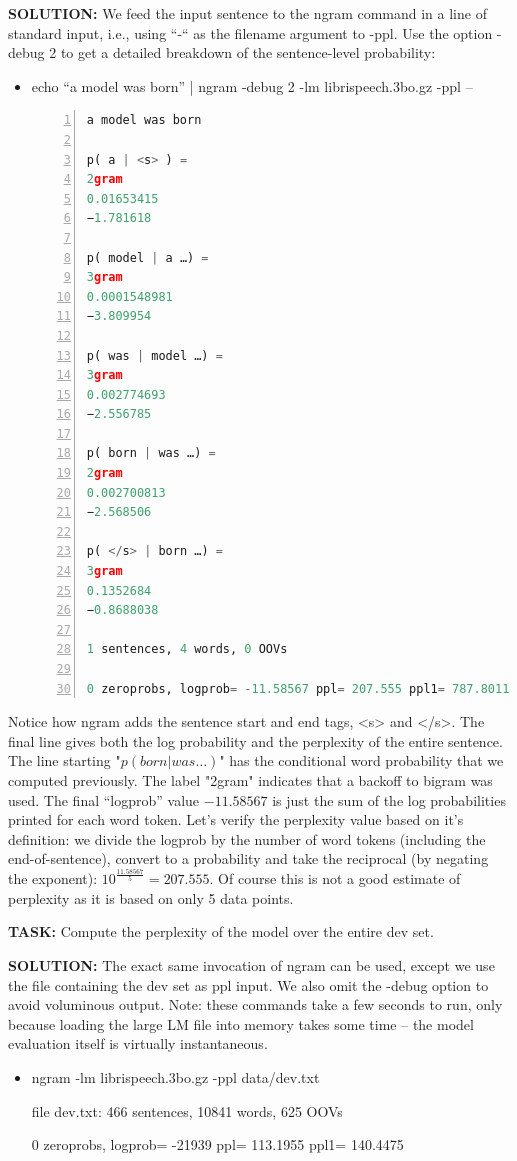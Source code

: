 {\bf SOLUTION:} We feed the input sentence to the ngram command in a line of standard input, i.e., using “-“ as the filename argument to -ppl. Use the option -debug 2 to get a detailed breakdown of the sentence-level probability:
\begin{itemize}
	\item echo “a model was born” | ngram -debug 2 -lm librispeech.3bo.gz -ppl –
\begin{lstlisting}[language = python, numbers=left, 
	 numberstyle=\tiny,keywordstyle=\color{blue!70},
	 commentstyle=\color{red!50!green!50!blue!50},frame=shadowbox,
	 rulesepcolor=\color{red!20!green!20!blue!20},basicstyle=\ttfamily]
a model was born

p( a | <s> ) =
2gram
0.01653415
−1.781618

p( model | a …) =
3gram
0.0001548981
−3.809954

p( was | model …) =
3gram
0.002774693
−2.556785

p( born | was …) =
2gram
0.002700813
−2.568506

p( </s> | born …) =
3gram
0.1352684
−0.8688038

1 sentences, 4 words, 0 OOVs

0 zeroprobs, logprob= -11.58567 ppl= 207.555 ppl1= 787.8011
\end{lstlisting}

\end{itemize}

Notice how ngram adds the sentence start and end tags, <s> and </s>. The final line gives both the log probability and the perplexity of the entire sentence. The line starting "$p(born | was …)$" has the conditional word probability that we computed previously. The label "2gram" indicates that a backoff to bigram was used. The final “logprob” value $-11.58567$ is just the sum of the log probabilities printed for each word token. Let’s verify the perplexity value based on it’s definition: we divide the logprob by the number of word tokens (including the end-of-sentence), convert to a probability and take the reciprocal (by negating the exponent): $10^{\frac{11.58567}{5}}= 207.555$. Of course this is not a good estimate of perplexity as it is based on only 5 data points.

{\bf TASK:} Compute the perplexity of the model over the entire dev set.

{\bf SOLUTION:} The exact same invocation of ngram can be used, except we use the file containing the dev set as ppl input. We also omit the -debug option to avoid voluminous output. Note: these commands take a few seconds to run, only because loading the large LM file into memory takes some time – the model evaluation itself is virtually instantaneous.
\begin{itemize}
	\item ngram -lm librispeech.3bo.gz -ppl data/dev.txt

			file dev.txt: 466 sentences, 10841 words, 625 OOVs

			0 zeroprobs, logprob= -21939 ppl= 113.1955 ppl1= 140.4475
\end{itemize}

